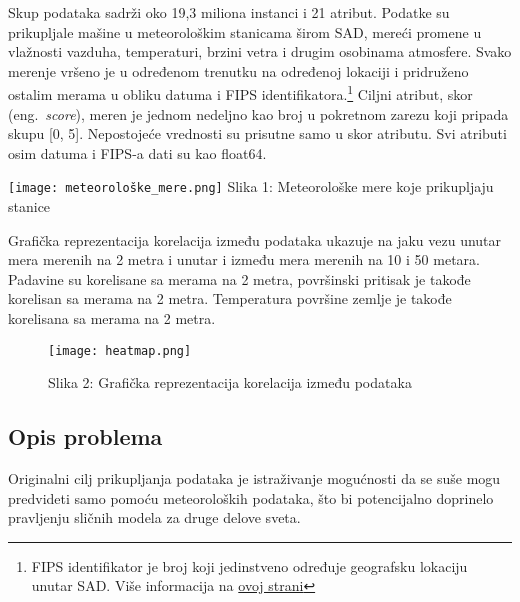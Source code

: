 \documentclass[a4paper]{article}
\begin{document}
{\noindent\begin{minipage}{0.4\textwidth}
Skup podataka sadrži oko 19,3 miliona instanci i 21 atribut. Podatke su prikupljale mašine u meteorološkim stanicama širom SAD, mereći promene u vlažnosti vazduha, temperaturi, brzini vetra i drugim osobinama atmosfere. Svako merenje vršeno je u određenom trenutku na određenoj lokaciji i pridruženo ostalim merama u obliku datuma i FIPS identifikatora.\footnote[1]{FIPS identifikator je broj koji jedinstveno određuje geografsku lokaciju unutar SAD. Više informacija na \href{https://www.nrcs.usda.gov/wps/portal/nrcs/detail/national/home/?cid=nrcs143_013697}{ovoj strani}} Ciljni atribut, skor (eng.~{\em score}), meren je jednom nedeljno kao broj u pokretnom zarezu koji pripada skupu [0, 5]. Nepostojeće vrednosti su prisutne samo u skor atributu. Svi atributi osim datuma i FIPS-a dati su kao float64.
\end{minipage}
\noindent\begin{minipage}{0.1\textwidth}
\hphantom{a}
\end{minipage}
\noindent\begin{minipage}{0.4\textwidth}
\texttt{[image: meteorološke\_mere.png]}
Slika 1: Meteorološke mere koje prikupljaju stanice\\
\end{minipage}
Grafička reprezentacija korelacija između podataka ukazuje na jaku vezu unutar mera merenih na 2 metra i unutar i između mera merenih na 10 i 50 metara. Padavine su korelisane sa merama na 2 metra, površinski pritisak je takođe korelisan sa merama na 2 metra. Temperatura površine zemlje je takođe korelisana sa merama na 2 metra.

\noindent\begin{figure}[h!]
\begin{center}
\texttt{[image: heatmap.png]}
\end{center}
\hphantom{aaaaaaaaaaaaaa}Slika 2: Grafička reprezentacija korelacija između podataka
\label{fig:heatmap}
\end{figure}

\subsection{Opis problema}
\label{subsec:opis_problema}

\begin{minipage}{0.6\textwidth}
Originalni cilj prikupljanja podataka je istraživanje mogućnosti da se suše mogu predvideti samo pomoću meteoroloških podataka, što bi potencijalno doprinelo pravljenju sličnih modela za druge delove sveta.


\end{minipage}}
\end{document}
